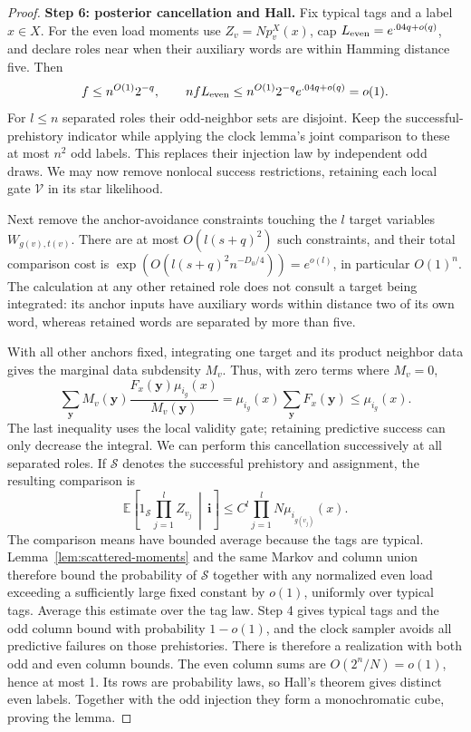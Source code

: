 \begin{proof}
\noindent\textbf{Step 6: posterior cancellation and Hall.}\quad
Fix typical tags and a label \(x\in X\). For the even load moments use
\(Z_v=Np_v^X(x)\), cap \(L_{\rm even}=e^{.04q+o(q)}\), and declare
roles near when their auxiliary words are within Hamming distance five.
Then
\[
 f\le n^{O(1)}2^{-q},\qquad
 nfL_{\rm even}\le n^{O(1)}2^{-q}e^{.04q+o(q)}=o(1).
\]
For \(l\le n\) separated roles their odd-neighbor sets are disjoint.
Keep the successful-prehistory indicator while applying the clock
lemma's joint comparison to these at most \(n^2\) odd labels. This
replaces their injection law by independent odd draws. We may now
remove nonlocal success restrictions, retaining each local gate
\(\mathcal V\) in its star likelihood.

Next remove the anchor-avoidance constraints touching the \(l\) target
variables \(W_{g(v),t(v)}\). There are at most \(O(l(s+q)^2)\) such
constraints, and their total comparison cost is
\(\exp(O(l(s+q)^2n^{-D_0/4}))=e^{o(l)}\), in particular \(O(1)^n\).
The calculation at any other retained role does not consult a target
being integrated: its anchor inputs have auxiliary words within distance
two of its own word, whereas retained words are separated by more than
five.

With all other anchors fixed, integrating one target and its product
neighbor data gives the marginal data subdensity \(M_v\). Thus, with
zero terms where \(M_v=0\),
\[
 \sum_{\mathbf y}M_v(\mathbf y)
       \frac{F_x(\mathbf y)\mu_{i_g}(x)}{M_v(\mathbf y)}
 =\mu_{i_g}(x)\sum_{\mathbf y}F_x(\mathbf y)
 \le\mu_{i_g}(x).
\]
The last inequality uses the local validity gate; retaining predictive
success can only decrease the integral. We can perform this cancellation
successively at all separated roles. If \(\mathcal S\) denotes the
successful prehistory and assignment, the resulting comparison is
\[
 \mathbb E\!\left[1_{\mathcal S}\prod_{j=1}^l Z_{v_j}
                 \,\middle|\,\mathbf i\right]
 \le C^l\prod_{j=1}^l N\mu_{i_{g(v_j)}}(x).
\]
The comparison means have bounded average because the tags are typical.
Lemma~\ref{lem:scattered-moments} and the same Markov and column union
therefore bound the probability of \(\mathcal S\) together with any
normalized even load exceeding a sufficiently large fixed constant by
\(o(1)\), uniformly over typical tags.
Average this estimate over the tag law. Step 4 gives typical tags and
the odd column bound with probability \(1-o(1)\), and the clock sampler
avoids all predictive failures on those prehistories. There is therefore
a realization with both odd and even column bounds. The even column
sums are \(O(2^n/N)=o(1)\), hence at most 1. Its rows are probability
laws, so Hall's theorem gives distinct even labels. Together with the
odd injection they form a monochromatic cube, proving the lemma.
\end{proof}


